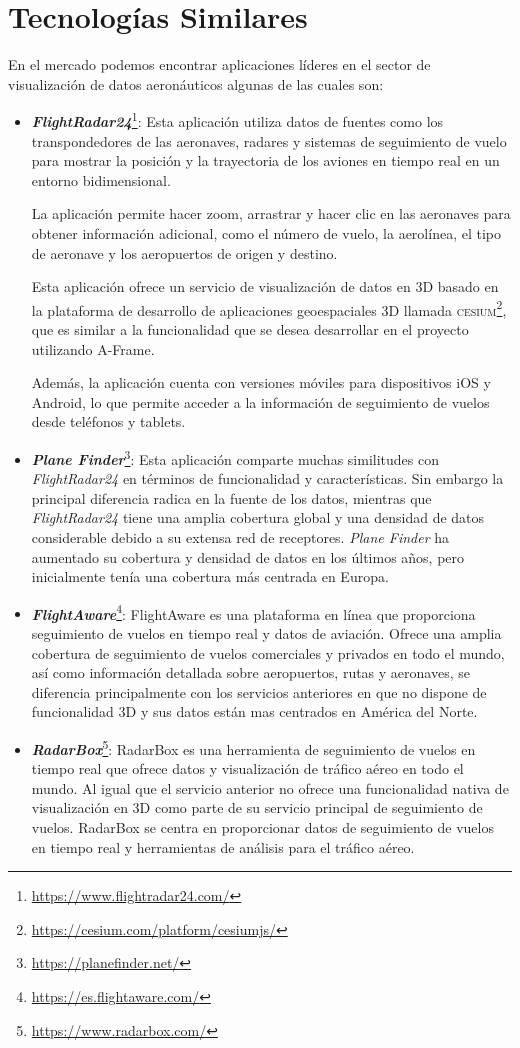 \documentclass[a4paper, 11pt]{book}
\begin{document}
\section{Tecnologías Similares}
\label{sec:tecnosimilares}
En el mercado podemos encontrar aplicaciones líderes en el sector de visualización de datos aeronáuticos algunas de las cuales son:
\begin{itemize}
	\item \textbf{\emph{FlightRadar24}}\footnote{\url{https://www.flightradar24.com/}}: Esta aplicación utiliza datos de fuentes como los transpondedores de las aeronaves, radares y sistemas de seguimiento de vuelo para mostrar la posición y la trayectoria de los aviones en tiempo real en un entorno bidimensional.
	
	La aplicación permite hacer zoom, arrastrar y hacer clic en las aeronaves para obtener información adicional, como el número de vuelo, la aerolínea, el tipo de aeronave y los aeropuertos de origen y destino.
	
	Esta aplicación ofrece un servicio de visualización de datos en 3D basado en la plataforma de desarrollo de aplicaciones geoespaciales 3D llamada \textsc{cesium}\footnote{\url{https://cesium.com/platform/cesiumjs/}}, que es similar a la funcionalidad que se desea desarrollar en el proyecto utilizando A-Frame.
	
	Además, la aplicación cuenta con versiones móviles para dispositivos iOS y Android, lo que permite acceder a la información de seguimiento de vuelos desde teléfonos y tablets.
	\item \textbf{\emph{Plane Finder}}\footnote{\url{https://planefinder.net/}}: Esta aplicación comparte muchas similitudes con \emph{FlightRadar24} en términos de funcionalidad y características. Sin embargo la principal diferencia radica en la fuente de los datos, mientras que \emph{FlightRadar24} tiene una amplia cobertura global y una densidad de datos considerable debido a su extensa red de receptores. \emph{Plane Finder} ha aumentado su cobertura y densidad de datos en los últimos años, pero inicialmente tenía una cobertura más centrada en Europa.
	\item \textbf{\emph{FlightAware}}\footnote{\url{https://es.flightaware.com/}}: FlightAware es una plataforma en línea que proporciona seguimiento de vuelos en tiempo real y datos de aviación. Ofrece una amplia cobertura de seguimiento de vuelos comerciales y privados en todo el mundo, así como información detallada sobre aeropuertos, rutas y aeronaves, se diferencia principalmente con los servicios anteriores en que no dispone de funcionalidad 3D y sus datos están mas centrados en América del Norte.
	\item \textbf{\emph{RadarBox}}\footnote{\url{https://www.radarbox.com/}}: RadarBox es una herramienta de seguimiento de vuelos en tiempo real que ofrece datos y visualización de tráfico aéreo en todo el mundo. Al igual que el servicio anterior no ofrece una funcionalidad nativa de visualización en 3D como parte de su servicio principal de seguimiento de vuelos. RadarBox se centra en proporcionar datos de seguimiento de vuelos en tiempo real y herramientas de análisis para el tráfico aéreo.
\end{itemize}
\end{document}
